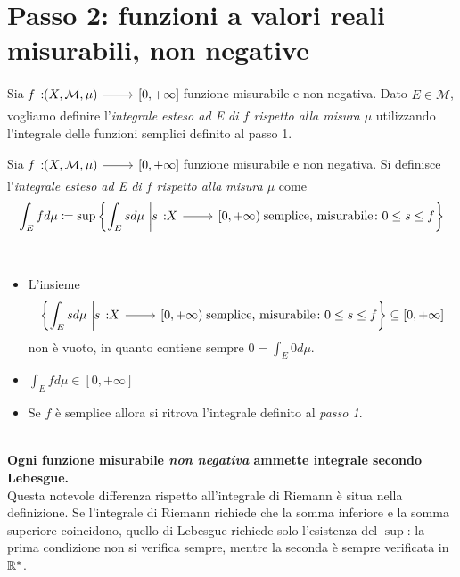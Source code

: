 \section{Passo 2: funzioni a valori reali misurabili, non negative}
Sia $\funz{f}{\left(X,\mathcal{M},\mu\right)}{\left[0,+\infty\right]}$ funzione misurabile e non negativa. Dato $E\in\mathcal{M}$, vogliamo definire l'\textit{integrale esteso ad E di $f$ rispetto alla misura $\mu$} utilizzando l'integrale delle funzioni semplici definito al passo 1. 
\begin{define}
	Sia $\funz{f}{\left(X,\mathcal{M},\mu\right)}{\left[0,+\infty\right]}$ funzione misurabile e non negativa. Si definisce l'\textit{integrale esteso ad E di $f$ rispetto alla misura $\mu$} come
	\begin{equation}
		\int_Efd\mu\coloneqq\sup\left\{\int_Esd\mu\ \middle| \funz{s}{X}{\left[0,+\infty\right)}\text{ semplice, misurabile}\colon0\leq s\leq f\right\}
	\end{equation}
\end{define}
\begin{observe}~{}
	\begin{itemize}
		\item L'insieme
		\begin{equation*}
			\left\{\int_Esd\mu\ \middle|\funz{s}{X}{\left[0,+\infty\right)}\text{ semplice, misurabile}\colon0\leq s\leq f\right\}\subseteq \left[0,+\infty\right]
		\end{equation*} non è vuoto, in quanto contiene sempre $0=\int_E 0d\mu$.
		\item $\int_Efd\mu\in\left[0,+\infty\right]$
		\item Se $f$ è semplice allora si ritrova l'integrale definito al \textit{passo 1}.
	\end{itemize}
\end{observe}
\begin{attention}~{}\\
	\textbf{Ogni funzione misurabile \textit{non negativa} ammette integrale secondo Lebesgue.}\\
	Questa notevole differenza rispetto all'integrale di Riemann è situa nella definizione. Se l'integrale di Riemann richiede che la somma inferiore e la somma superiore coincidono, quello di Lebesgue richiede solo l'esistenza del $\sup$: la prima condizione non si verifica sempre, mentre la seconda è sempre verificata in $\mathbb{R}^{\ast}$.
\end{attention}
